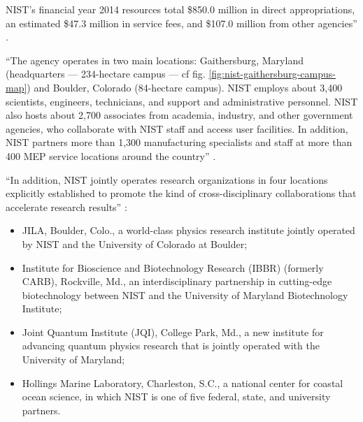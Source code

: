 NIST's financial year 2014 resources total \$850.0 million in direct appropriations, an estimated \$47.3 million in service fees, and \$107.0 million from other agencies'' \cite{nist2016general}.

``The agency operates in two main locations: Gaithersburg, Maryland (headquarters — 234-hectare campus — cf fig. \ref{fig:nist-gaithersburg-campus-map}) and Boulder, Colorado (84-hectare campus). NIST employs about 3,400 scientists, engineers, technicians, and support and administrative personnel. NIST also hosts about 2,700 associates from academia, industry, and other government agencies, who collaborate with NIST staff and access user facilities. In addition, NIST partners more than 1,300 manufacturing specialists and staff at more than 400 MEP service locations around the country'' \cite{nist2016general}.

``In addition, NIST jointly operates research organizations in four locations explicitly established to promote the kind of cross-disciplinary collaborations that accelerate research results'' \cite{nist2016locations}:

\begin{itemize}
    \item JILA, Boulder, Colo., a world-class physics research institute jointly operated by NIST and the University of Colorado at Boulder;
    \item Institute for Bioscience and Biotechnology Research (IBBR) (formerly CARB), Rockville, Md., an interdisciplinary partnership in cutting-edge biotechnology between NIST and the University of Maryland Biotechnology Institute;
    \item Joint Quantum Institute (JQI), College Park, Md., a new institute for advancing quantum physics research that is jointly operated with the University of Maryland;
    \item Hollings Marine Laboratory, Charleston, S.C., a national center for coastal ocean science, in which NIST is one of five federal, state, and university partners.
\end{itemize}

